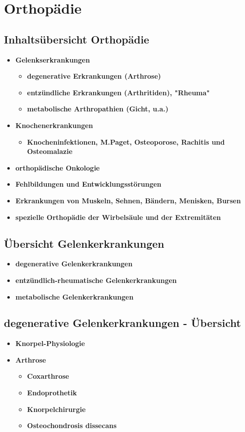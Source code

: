 \section{Orthopädie}
\subsection{Inhaltsübersicht Orthopädie}
	\begin{itemize}
		\item \textbf{Gelenkserkrankungen}
			\begin{itemize}
				\item \textbf{degenerative Erkrankungen (Arthrose)}
				\item \textbf{entzündliche Erkrankungen (Arthritiden), "Rheuma"}
				\item \textbf{metabolische Arthropathien (Gicht, u.a.)}
			\end{itemize}
		\item \textbf{Knochenerkrankungen}
			\begin{itemize}
				\item \textbf{Knocheninfektionen, M.Paget, Osteoporose, Rachitis und Osteomalazie}
			\end{itemize}
		\item \textbf{orthopädische Onkologie}
		\item \textbf{Fehlbildungen und Entwicklungsstörungen}
		\item \textbf{Erkrankungen von Muskeln, Sehnen, Bändern, Menisken, Bursen}
		\item \textbf{spezielle Orthopädie der Wirbelsäule und der Extremitäten}
 	\end{itemize}

\subsection{Übersicht Gelenkerkrankungen}
	\begin{itemize}
		\item \textbf{degenerative Gelenkerkrankungen}
		\item \textbf{entzündlich-rheumatische Gelenkerkrankungen}
		\item \textbf{metabolische Gelenkerkrankungen}
 	\end{itemize}

\subsection{degenerative Gelenkerkrankungen - Übersicht}
	\begin{itemize}
		\item \textbf{Knorpel-Physiologie}
		\item \textbf{Arthrose}
			\begin{itemize}
				\item \textbf{Coxarthrose}
				\item \textbf{Endoprothetik}
				\item \textbf{Knorpelchirurgie}
				\item \textbf{Osteochondrosis dissecans}
	 		\end{itemize}
	\end{itemize}


